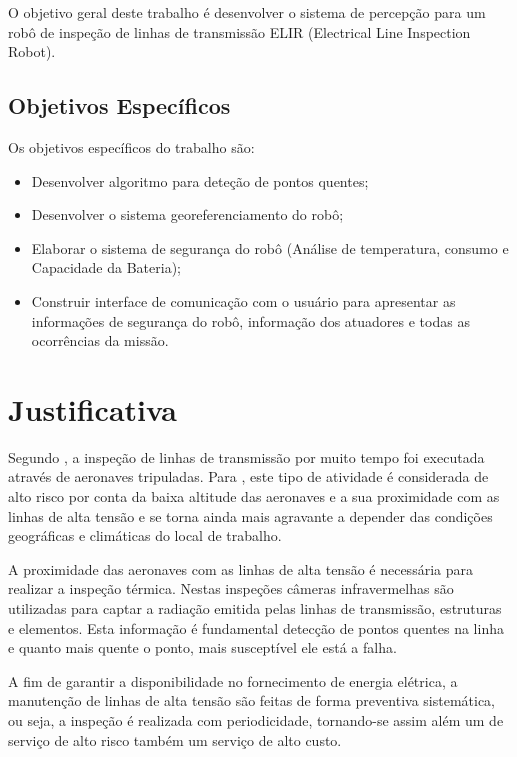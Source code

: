 O  objetivo geral deste  trabalho   é  desenvolver o sistema de percepção para um robô de inspeção de linhas de transmissão ELIR (Electrical Line Inspection Robot).


\subsection{Objetivos Específicos}
Os objetivos específicos do trabalho são:
\label{ssec:objesp}

\begin{itemize}
\item Desenvolver algoritmo para deteção de pontos quentes;
\item Desenvolver o sistema georeferenciamento do robô;
\item Elaborar o sistema de segurança do robô (Análise de temperatura, consumo e Capacidade da Bateria);
\item Construir interface de comunicação com o usuário para apresentar as informações de segurança do robô, informação dos atuadores e todas as ocorrências da missão.
\end{itemize}

\section{Justificativa}
\label{sec:justi}

Segundo , a inspeção de linhas de transmissão por muito tempo foi executada através de aeronaves tripuladas. Para , este tipo de atividade é considerada de alto risco por conta da baixa altitude das aeronaves e a sua proximidade com as linhas de alta tensão e se torna ainda mais agravante a depender das condições geográficas e climáticas do local de trabalho.

A proximidade das aeronaves com as linhas de alta tensão é necessária para realizar a inspeção térmica. Nestas inspeções câmeras infravermelhas são utilizadas para captar a radiação emitida pelas linhas de transmissão, estruturas e elementos. Esta informação é fundamental detecção de pontos quentes na linha e quanto mais quente o ponto, mais susceptível ele está a falha.

A fim de garantir a disponibilidade no fornecimento de energia elétrica, a manutenção de linhas de alta tensão são feitas de forma preventiva sistemática, ou seja, a inspeção é realizada com periodicidade, tornando-se assim além um de serviço de alto risco também um serviço de alto custo.

